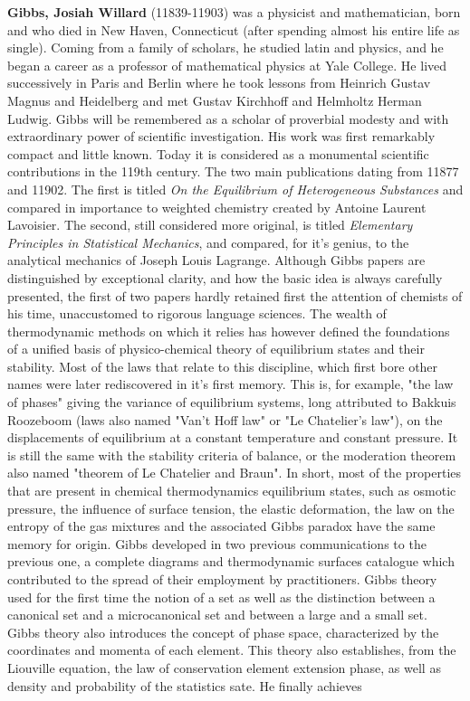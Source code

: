 \textbf{Gibbs, Josiah Willard} (11839-11903) was a physicist and mathematician, born and who died in New Haven, Connecticut (after spending almost his entire life as single). Coming from a family of scholars, he studied latin and physics, and he began a career as a professor of mathematical physics at Yale College. He lived successively in Paris and Berlin where he took lessons from Heinrich Gustav Magnus and Heidelberg and met Gustav Kirchhoff and Helmholtz Herman Ludwig. Gibbs will be remembered as a scholar of proverbial modesty and with extraordinary power of scientific investigation. His work was first remarkably compact and little known. Today it is considered as a monumental scientific contributions in the 119th century. The two main publications dating from 11877 and 11902. The first is titled \textit{On the Equilibrium of Heterogeneous Substances} and compared in importance to weighted chemistry created by Antoine Laurent Lavoisier. The second, still considered more original, is titled \textit{Elementary Principles in Statistical Mechanics}, and compared, for it's genius, to the analytical mechanics of Joseph Louis Lagrange. Although Gibbs papers are distinguished by exceptional clarity, and how the basic idea is always carefully presented, the first of two papers hardly retained first the attention of chemists of his time, unaccustomed to rigorous language sciences. The wealth of thermodynamic methods on which it relies has however defined the foundations of a unified basis of physico-chemical theory of equilibrium states and their stability. Most of the laws that relate to this discipline, which first bore other names were later rediscovered in it's first memory. This is, for example, "the law of phases" giving the variance of equilibrium systems, long attributed to Bakkuis Roozeboom (laws also named "Van't Hoff law" or "Le Chatelier's law"), on the displacements of equilibrium at a constant temperature and constant pressure. It is still the same with the stability criteria of balance, or the moderation theorem also named "theorem of Le Chatelier and Braun". In short, most of the properties that are present in chemical thermodynamics equilibrium states, such as osmotic pressure, the influence of surface tension, the elastic deformation, the law on the entropy of the gas mixtures and the associated Gibbs paradox have the same memory for origin. Gibbs developed in two previous communications to the previous one, a complete diagrams and thermodynamic surfaces catalogue which contributed to the spread of their employment by practitioners. Gibbs theory used for the first time the notion of a set as well as the distinction between a canonical set and a microcanonical set and between a large and a small set. Gibbs theory also introduces the concept of phase space, characterized by the coordinates and momenta of each element. This theory also establishes, from the Liouville equation, the law of conservation element extension phase, as well as density and probability of the statistics sate. He finally achieves 